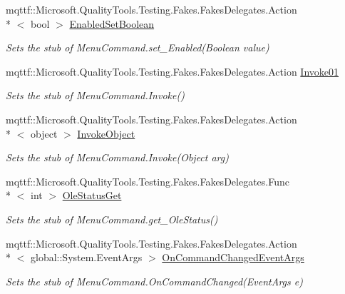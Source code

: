 \begin{DoxyCompactItemize}
mqttf\-::\-Microsoft.\-Quality\-Tools.\-Testing.\-Fakes.\-Fakes\-Delegates.\-Action\\*
$<$ bool $>$ \hyperlink{class_system_1_1_component_model_1_1_design_1_1_fakes_1_1_stub_menu_command_af56b28cb2a72c7202bc35933838a2c5a}{Enabled\-Set\-Boolean}
\begin{DoxyCompactList}\small\item\em Sets the stub of Menu\-Command.\-set\-\_\-\-Enabled(\-Boolean value)\end{DoxyCompactList}\item 
mqttf\-::\-Microsoft.\-Quality\-Tools.\-Testing.\-Fakes.\-Fakes\-Delegates.\-Action \hyperlink{class_system_1_1_component_model_1_1_design_1_1_fakes_1_1_stub_menu_command_a7bb5069b2ce8ebdc191c7368550d33e0}{Invoke01}
\begin{DoxyCompactList}\small\item\em Sets the stub of Menu\-Command.\-Invoke()\end{DoxyCompactList}\item 
mqttf\-::\-Microsoft.\-Quality\-Tools.\-Testing.\-Fakes.\-Fakes\-Delegates.\-Action\\*
$<$ object $>$ \hyperlink{class_system_1_1_component_model_1_1_design_1_1_fakes_1_1_stub_menu_command_a4b34f89591f5eadc9d68836b77a50fbc}{Invoke\-Object}
\begin{DoxyCompactList}\small\item\em Sets the stub of Menu\-Command.\-Invoke(\-Object arg)\end{DoxyCompactList}\item 
mqttf\-::\-Microsoft.\-Quality\-Tools.\-Testing.\-Fakes.\-Fakes\-Delegates.\-Func\\*
$<$ int $>$ \hyperlink{class_system_1_1_component_model_1_1_design_1_1_fakes_1_1_stub_menu_command_ae4d0f3f0307d6eb9f21d32f328d8c5d6}{Ole\-Status\-Get}
\begin{DoxyCompactList}\small\item\em Sets the stub of Menu\-Command.\-get\-\_\-\-Ole\-Status()\end{DoxyCompactList}\item 
mqttf\-::\-Microsoft.\-Quality\-Tools.\-Testing.\-Fakes.\-Fakes\-Delegates.\-Action\\*
$<$ global\-::\-System.\-Event\-Args $>$ \hyperlink{class_system_1_1_component_model_1_1_design_1_1_fakes_1_1_stub_menu_command_aaf90bfe21ffe95e4a9ddda435feec2ee}{On\-Command\-Changed\-Event\-Args}
\begin{DoxyCompactList}\small\item\em Sets the stub of Menu\-Command.\-On\-Command\-Changed(\-Event\-Args e)\end{DoxyCompactList}\item 

\end{DoxyCompactItemize}
